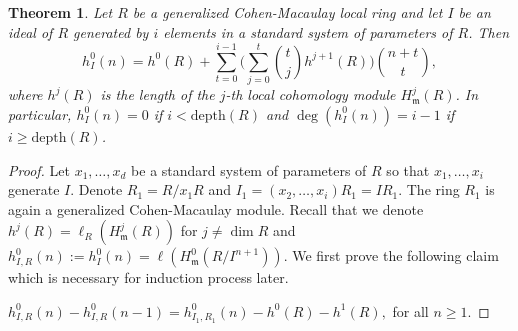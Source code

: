 \documentclass{amsart}
\newtheorem{theorem}{Theorem}[section]
\theoremstyle {definition}
\theoremstyle {remark}
\begin{document}
\begin{theorem}\label{39}
Let $R$ be a generalized Cohen-Macaulay local ring and let $I$ be an ideal of $R$ generated by $i$ elements in a standard system of parameters of $R$. Then
$$h_I^0(n)=h^0(R)+\sum_{t=0}^{i-1}\Big(\sum_{j=0}^t\binom{t}jh^{j+1}(R)\Big)\binom{n+t}{t},$$
where $h^j(R)$ is the length of the $j$-th local cohomology module $H^j_{\ensuremath{\mathfrak m}}(R)$. In particular, $h_I^0(n)=0$ if $i<\mathrm{depth}(R)$ and $\deg(h_I^0(n))=i-1$ if $i\geq \mathrm{depth}(R)$.
\end{theorem}
\begin{proof}
Let $x_1, \ldots, x_d$ be a standard system of parameters of $R$ so that $x_1, \ldots, x_i$ generate $I$. Denote $R_1=R/x_1R$ and $I_1=(x_2, \ldots, x_i)R_1=IR_1$. The ring $R_1$ is again a generalized Cohen-Macaulay module. Recall that we denote $h^j(R)=\ell_R(H^j_{\ensuremath{\mathfrak m}}(R))$ for $j\not=\dim R$ and $h^0_{I, R}(n):=h^0_I(n)=\ell(H^0_{\ensuremath{\mathfrak m}}(R/I^{n+1}))$. We first prove the following claim which is necessary for induction process later.
\medskip

 $h_{I, R}^0(n)-h_{I, R}^0(n-1)=h_{I_1, R_1}^0(n)-h^0(R)-h^1(R),$ for all $n\geq 1$.
\medskip


\end{proof}
\end{document}
